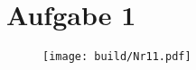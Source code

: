 \section{Aufgabe 1}
\label{sec:Aufgabe1}
\begin{figure}
\texttt{[image: build/Nr11.pdf]}
\end{figure}
